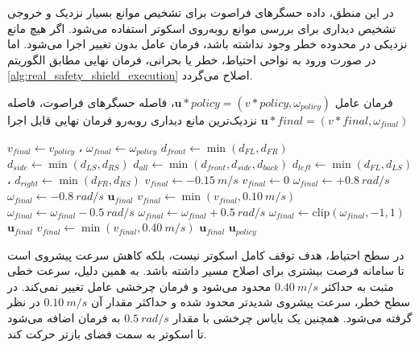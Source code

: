 در این منطق، داده حسگرهای فراصوت برای تشخیص موانع بسیار نزدیک و خروجی تشخیص دیداری برای بررسی موانع روبه‌روی اسکوتر استفاده می‌شود. اگر هیچ مانع نزدیکی در محدوده خطر وجود نداشته باشد، فرمان عامل بدون تغییر اجرا می‌شود. اما در صورت ورود به نواحی احتیاط، خطر یا بحرانی، فرمان نهایی مطابق الگوریتم \ref{alg:real_safety_shield_execution} اصلاح می‌گردد.
\begin{algorithm}[htb]
	\footnotesize
	\caption{اعمال سپر ایمنی فعال روی فرمان حرکتی عامل}
	\label{alg:real_safety_shield_execution}
	\begin{algorithmic}[1]
		\REQUIRE فرمان عامل $\mathbf{u}*{policy}=(v*{policy},\omega_{policy})$، فاصله حسگرهای فراصوت، فاصله نزدیک‌ترین مانع دیداری روبه‌رو
		\ENSURE فرمان نهایی قابل اجرا $\mathbf{u}*{final}=(v*{final},\omega_{final})$
		
		\STATE $v_{final}\gets v_{policy}$ ، $\omega_{final}\gets \omega_{policy}$
		\STATE $d_{front}\gets \min(d_{FL},d_{FR})$
		\STATE $d_{side}\gets \min(d_{LS},d_{RS})$
		\STATE $d_{all}\gets \min(d_{front},d_{side}, d_{back})$
		\STATE $d_{left}\gets \min(d_{FL},d_{LS})$ ، $d_{right}\gets \min(d_{FR},d_{RS})$
		\STATE $v_{final}\gets -0.15~m/s$
		\ELSE
		\STATE $v_{final}\gets 0$
		\ENDIF
		\STATE $\omega_{final}\gets +0.8~rad/s$
		\ELSE
		\STATE $\omega_{final}\gets -0.8~rad/s$
		\ENDIF
		\RETURN $\mathbf{u}_{final}$
		\ENDIF
		\STATE $v_{final}\gets \min(v_{final},0.10~m/s)$
		\STATE $\omega_{final}\gets \omega_{final}-0.5~rad/s$
		\ELSE
		\STATE $\omega_{final}\gets \omega_{final}+0.5~rad/s$
		\ENDIF
		\STATE $\omega_{final}\gets \mathrm{clip}(\omega_{final},-1,1)$
		\RETURN $\mathbf{u}_{final}$
		\ENDIF
		\STATE $v_{final}\gets \min(v_{final},0.40~m/s)$
		\RETURN $\mathbf{u}_{final}$
		\ENDIF
		\RETURN $\mathbf{u}_{policy}$ 
	\end{algorithmic}
	
\end{algorithm}



در سطح احتیاط، هدف توقف کامل اسکوتر نیست، بلکه کاهش سرعت پیشروی است تا سامانه فرصت بیشتری برای اصلاح مسیر داشته باشد. به همین دلیل، سرعت خطی مثبت به حداکثر $0.40~m/s$ محدود می‌شود و فرمان چرخشی عامل تغییر نمی‌کند. در سطح خطر، سرعت پیشروی شدیدتر محدود شده و حداکثر مقدار آن $0.10~m/s$ در نظر گرفته می‌شود. همچنین یک بایاس چرخشی با مقدار $0.5~rad/s$ به فرمان اضافه می‌شود تا اسکوتر به سمت فضای بازتر حرکت کند.

